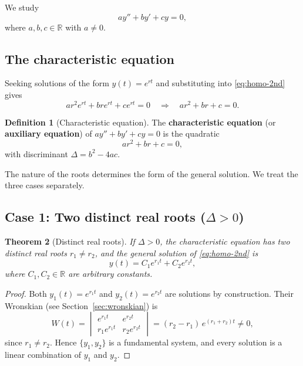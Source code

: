\documentclass[12pt,a4paper,openany]{book}
\theoremstyle{definition}
\newtheorem{definition}{Definition}[chapter]
\theoremstyle{plain}
\newtheorem{theorem}[definition]{Theorem}
\theoremstyle{remark}
\newcommand{\R}{\mathbb{R}}
\begin{document}
We study
\begin{equation}\label{eq:homo-2nd}
  ay'' + by' + cy = 0,
\end{equation}
where $a, b, c \in \R$ with $a \ne 0$.

\subsection{The characteristic equation}\label{subsec:char-eq}

Seeking solutions of the form $y(t) = e^{rt}$ and substituting into
\eqref{eq:homo-2nd} gives
\[
  a r^2 e^{rt} + b r e^{rt} + c e^{rt} = 0
  \quad\Longrightarrow\quad
  ar^2 + br + c = 0.
\]

\begin{definition}[Characteristic equation]\label{def:char-eq}
The \textbf{characteristic equation} (or \textbf{auxiliary equation}) of
$ay'' + by' + cy = 0$ is the quadratic
\begin{equation}\label{eq:char-poly}
  ar^2 + br + c = 0,
\end{equation}
with discriminant $\Delta = b^2 - 4ac$.
\end{definition}

The nature of the roots determines the form of the general solution. We treat
the three cases separately.

\subsection{Case 1: Two distinct real roots ($\Delta > 0$)}\label{subsec:case1}

\begin{theorem}[Distinct real roots]\label{thm:distinct-real}
If $\Delta > 0$, the characteristic equation has two distinct real roots
$r_1 \ne r_2$, and the general solution of \eqref{eq:homo-2nd} is
\begin{equation}\label{eq:gen-sol-case1}
  y(t) = C_1 e^{r_1 t} + C_2 e^{r_2 t},
\end{equation}
where $C_1, C_2 \in \R$ are arbitrary constants.
\end{theorem}

\begin{proof}
Both $y_1(t) = e^{r_1 t}$ and $y_2(t) = e^{r_2 t}$ are solutions by
construction. Their Wronskian (see Section~\ref{sec:wronskian}) is
\[
  W(t) = \begin{vmatrix} e^{r_1 t} & e^{r_2 t} \\
  r_1 e^{r_1 t} & r_2 e^{r_2 t} \end{vmatrix}
  = (r_2 - r_1)\,e^{(r_1+r_2)t} \ne 0,
\]
since $r_1 \ne r_2$. Hence $\{y_1, y_2\}$ is a fundamental system, and
every solution is a linear combination of $y_1$ and $y_2$.
\end{proof}
\end{document}
